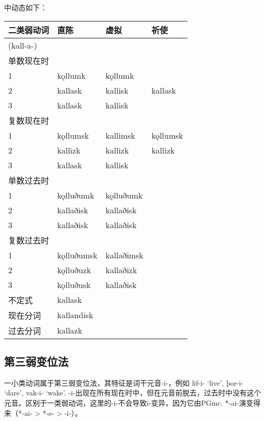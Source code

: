 中动态如下：

\begin{longtable}{llll}
    \toprule
    二类弱动词 & 直陈       & 虚拟       & 祈使     \\
    \midrule
    \endhead
    \bottomrule
    \endfoot
    (kall-a-)  &            &            &          \\
    单数现在时 &            &            &          \\
    1          & kǫllumk    & kǫllumk    &          \\
    2          & kallask    & kallisk    & kallask  \\
    3          & kallask    & kallisk    &          \\
    复数现在时 &            &            &          \\
    1          & kǫllumsk   & kallimsk   & kǫllumsk \\
    2          & kallizk    & kallizk    & kallizk  \\
    3          & kallask    & kallisk    &          \\
    单数过去时 &            &            &          \\
    1          & kǫlluðumk  & kǫlluðumk  &          \\
    2          & kallaðisk  & kallaðisk  &          \\
    3          & kallaðisk  & kallaðisk  &          \\
    复数过去时 &            &            &          \\
    1          & kǫlluðumsk & kallaðimsk &          \\
    2          & kǫlluðuzk  & kallaðizk  &          \\
    3          & kǫlluðusk  & kallaðisk  &          \\
    不定式     & kallask    &            &          \\
    现在分词   & kallandisk &            &          \\
    过去分词   & kallazk    &            &          \\
\end{longtable}

\subsection{第三弱变位法}\label{第三弱变位法}

一小类动词属于第三弱变位法，其特征是词干元音-i-，例如 lif-i- `live‌', þor-i- `dare‌', vak-i- `wake‌'.
-i-出现在所有现在时中，但在元音前脱去，过去时中没有这个元音。区别于一类弱动词，这里的-i-不会导致i-变异，因为它由PGmc. *-ai-演变得来（*-ai- > *-e- > -i-）。

